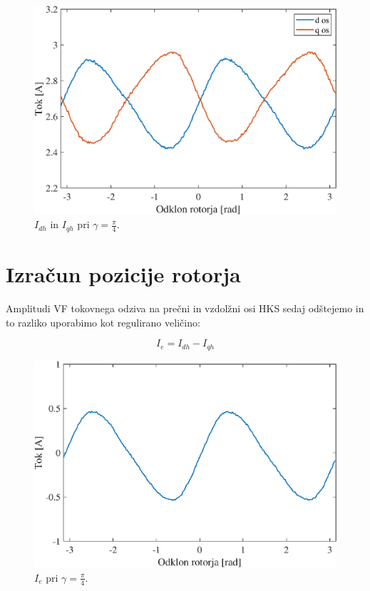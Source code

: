 \documentclass[a4paper,twoside,openright,12pt,slovene]{book}
\begin{document}
\begin{figure}[!htbp]
    \centering
    \includegraphics[width=0.9\columnwidth]{Slike/tokovniOdzivKot45.eps}
    \caption{\label{tokovniOdzivKot45} $I_{dh}$ in $I_{qh}$ pri  $\gamma = \frac{\pi}{4}$.}
\end{figure}

\section{Izračun pozicije rotorja}

Amplitudi VF tokovnega odziva na prečni in vzdolžni osi HKS sedaj odštejemo in to razliko uporabimo kot regulirano veličino:

\begin{equation}
    I_e = I_{dh} - I_{qh}
\end{equation}

\begin{figure}[!htbp]
    \centering
    \includegraphics[width=0.9\columnwidth]{Slike/reguliranaVelicinaIdq0.eps}
    \caption{\label{reguliranaVelicinaIdq0} $I_e$ pri $\gamma = \frac{\pi}{4}$.}
\end{figure}
\end{document}
